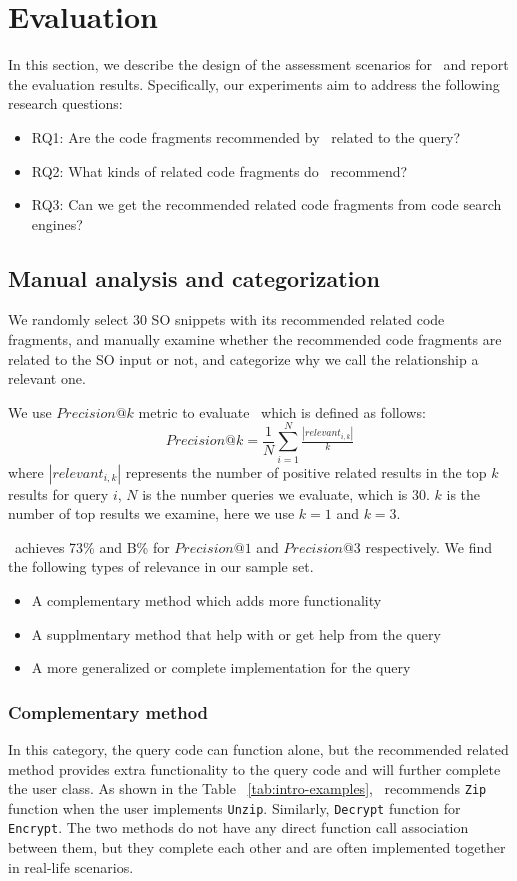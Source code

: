 \section{Evaluation}
\label{sec:Evaluation}
In this section, we describe the design of the assessment scenarios for \tool\ and report the evaluation results. Specifically, our experiments aim to address the following research questions:
\begin{itemize}
	\item RQ1: Are the code fragments recommended by \tool\ related to the query?
	\item RQ2: What kinds of related code fragments do \tool\ recommend?
	\item RQ3: Can we get the recommended related code fragments from code search engines?
\end{itemize}

\subsection{Manual analysis and categorization}
We randomly select 30 SO snippets with its recommended related code fragments, and manually examine whether the recommended code fragments are related to the SO input or not, and categorize why we call the relationship a relevant one.

We use $Precision@k$ metric to evaluate \tool\  which is defined as follows:
\begin{equation}
Precision@k = \frac{1}{N}\sum_{i=1}^{N}\tfrac{\left | relevant_{i,k} \right |}{k}
\end{equation}
where $\left | relevant_{i,k} \right |$ represents the number of positive related results in the top $k$ results for query $i$, $N$ is the number queries we evaluate, which is $30$. $k$ is the number of top results we examine, here we use $k=1$ and $k=3$.

\tool\ achieves 73\% and B\% for $Precision@1$ and $Precision@3$ respectively.
We find the following types of relevance in our sample set.
\begin{itemize}
	\item A complementary method which adds more functionality
	\item A supplmentary method that help with or get help from the query 
	\item A more generalized or complete implementation for the query	
\end{itemize}

\subsubsection{Complementary method} In this category, the query code can function alone, but the recommended related method provides extra functionality to the query code and will further complete the user class. As shown in the Table ~\ref{tab:intro-examples}, \tool\ recommends \texttt{Zip} function when the user implements \texttt{Unzip}. Similarly, \texttt{Decrypt} function for \texttt{Encrypt}. The two methods do not have any direct function call association between them, but they complete each other and are often implemented together in real-life scenarios. 

